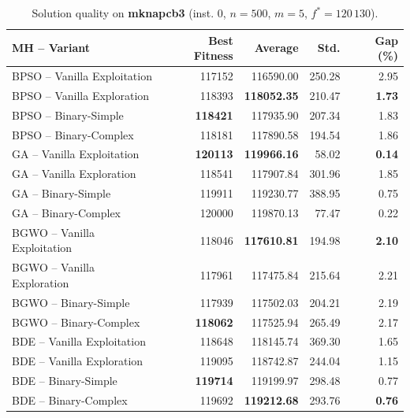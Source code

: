 \begin{table}[htbp]
  \centering
  \small
  \caption{Solution quality on \textbf{mknapcb3} (inst. 0, $n=500$, $m=5$, $f^*=120\,130$).}
  \label{tab:calidad_mknapcb3_0}
  \begin{tabular}{lrrrr}
    \toprule
    \textbf{MH -- Variant} &
    \textbf{Best Fitness} &
    \textbf{Average} &
    \textbf{Std.} &
    \textbf{Gap (\%)} \\
    \midrule
    BPSO -- Vanilla Exploitation &         117152 &        116590.00 & 250.28 &         2.95 \\
    BPSO -- Vanilla Exploration  &         118393 & \textbf{118052.35} & 210.47 & \textbf{1.73} \\
    BPSO -- Binary-Simple        & \textbf{118421} &        117935.90 & 207.34 &         1.83 \\
    BPSO -- Binary-Complex       &         118181 &        117890.58 & 194.54 &         1.86 \\
    \midrule
    GA -- Vanilla Exploitation   & \textbf{120113} & \textbf{119966.16} &  58.02 & \textbf{0.14} \\
    GA -- Vanilla Exploration    &         118541 &        117907.84 & 301.96 &         1.85 \\
    GA -- Binary-Simple          &         119911 &        119230.77 & 388.95 &         0.75 \\
    GA -- Binary-Complex         &         120000 &        119870.13 &  77.47 &         0.22 \\
    \midrule
    BGWO -- Vanilla Exploitation &         118046 & \textbf{117610.81} & 194.98 & \textbf{2.10} \\
    BGWO -- Vanilla Exploration  &         117961 &        117475.84 & 215.64 &         2.21 \\
    BGWO -- Binary-Simple        &         117939 &        117502.03 & 204.21 &         2.19 \\
    BGWO -- Binary-Complex       & \textbf{118062} &        117525.94 & 265.49 &         2.17 \\
    \midrule
    BDE -- Vanilla Exploitation  &         118648 &        118145.74 & 369.30 &         1.65 \\
    BDE -- Vanilla Exploration   &         119095 &        118742.87 & 244.04 &         1.15 \\
    BDE -- Binary-Simple         & \textbf{119714} &        119199.97 & 298.48 &         0.77 \\
    BDE -- Binary-Complex        &         119692 & \textbf{119212.68} & 293.76 & \textbf{0.76} \\
    \bottomrule
  \end{tabular}
\end{table}
